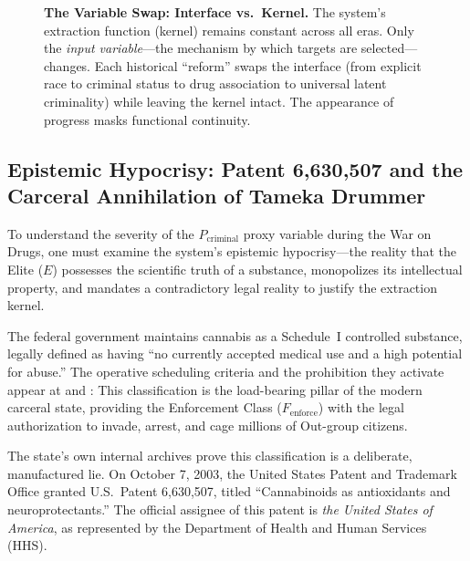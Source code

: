 \begin{figure}[htbp]
\caption{\textbf{The Variable Swap: Interface vs.\ Kernel.} The system's extraction function (kernel) remains constant across all eras. Only the \textit{input variable}---the mechanism by which targets are selected---changes. Each historical ``reform'' swaps the interface (from explicit race to criminal status to drug association to universal latent criminality) while leaving the kernel intact. The appearance of progress masks functional continuity.}
\label{fig:variable_swap}
\end{figure}

\subsection{Epistemic Hypocrisy: Patent 6,630,507 and the Carceral Annihilation of Tameka Drummer}

To understand the severity of the $P_{\text{criminal}}$ proxy variable during the War on Drugs, one must examine the system's epistemic hypocrisy---the reality that the Elite ($E$) possesses the scientific truth of a substance, monopolizes its intellectual property, and mandates a contradictory legal reality to justify the extraction kernel.

The federal government maintains cannabis as a Schedule~I controlled substance, legally defined as having ``no currently accepted medical use and a high potential for abuse.'' The operative scheduling criteria and the prohibition they activate appear at  and :
This classification is the load-bearing pillar of the modern carceral state, providing the Enforcement Class ($F_{\text{enforce}}$) with the legal authorization to invade, arrest, and cage millions of Out-group citizens.

The state's own internal archives prove this classification is a deliberate, manufactured lie. On October 7, 2003, the United States Patent and Trademark Office granted U.S.\ Patent 6,630,507, titled ``Cannabinoids as antioxidants and neuroprotectants.'' The official assignee of this patent is \textit{the United States of America}, as represented by the Department of Health and Human Services (HHS).

